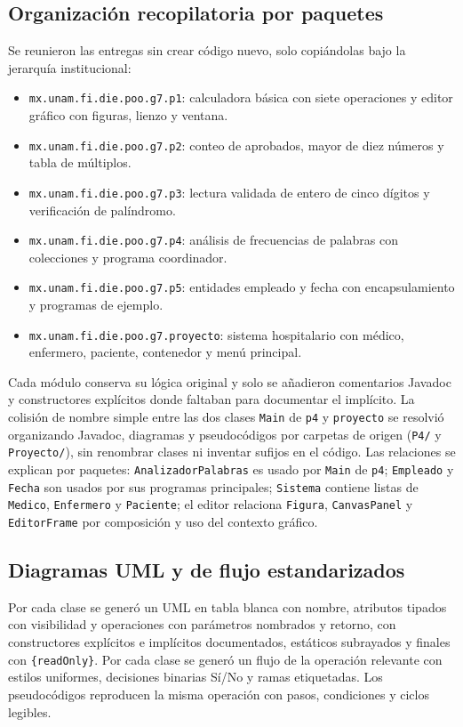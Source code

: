 \documentclass[letterpaper,12pt,oneside]{article}
\numberwithin{figure}{section}
\begin{document}
\subsection{Organizaci\'on recopilatoria por paquetes}
Se reunieron las entregas sin crear c\'odigo nuevo, solo copi\'andolas bajo la jerarqu\'ia institucional:
\begin{itemize}
    \item \texttt{mx.unam.fi.die.poo.g7.p1}: calculadora b\'asica con siete operaciones y editor gr\'afico con figuras, lienzo y ventana.
    \item \texttt{mx.unam.fi.die.poo.g7.p2}: conteo de aprobados, mayor de diez n\'umeros y tabla de m\'ultiplos.
    \item \texttt{mx.unam.fi.die.poo.g7.p3}: lectura validada de entero de cinco d\'igitos y verificaci\'on de pal\'indromo.
    \item \texttt{mx.unam.fi.die.poo.g7.p4}: an\'alisis de frecuencias de palabras con colecciones y programa coordinador.
    \item \texttt{mx.unam.fi.die.poo.g7.p5}: entidades empleado y fecha con encapsulamiento y programas de ejemplo.
    \item \texttt{mx.unam.fi.die.poo.g7.proyecto}: sistema hospitalario con m\'edico, enfermero, paciente, contenedor y men\'u principal.
\end{itemize}
Cada m\'odulo conserva su l\'ogica original y solo se a\~nadieron comentarios Javadoc y constructores expl\'icitos donde faltaban para documentar el impl\'icito. La colisi\'on de nombre simple entre las dos clases \texttt{Main} de \texttt{p4} y \texttt{proyecto} se resolvi\'o organizando Javadoc, diagramas y pseudoc\'odigos por carpetas de origen (\texttt{P4/} y \texttt{Proyecto/}), sin renombrar clases ni inventar sufijos en el c\'odigo. Las relaciones se explican por paquetes: \texttt{AnalizadorPalabras} es usado por \texttt{Main} de \texttt{p4}; \texttt{Empleado} y \texttt{Fecha} son usados por sus programas principales; \texttt{Sistema} contiene listas de \texttt{Medico}, \texttt{Enfermero} y \texttt{Paciente}; el editor relaciona \texttt{Figura}, \texttt{CanvasPanel} y \texttt{EditorFrame} por composici\'on y uso del contexto gr\'afico.

\subsection{Diagramas UML y de flujo estandarizados}
Por cada clase se gener\'o un UML en tabla blanca con nombre, atributos tipados con visibilidad y operaciones con par\'ametros nombrados y retorno, con constructores expl\'icitos e impl\'icitos documentados, est\'aticos subrayados y finales con \texttt{\{readOnly\}}. Por cada clase se gener\'o un flujo de la operaci\'on relevante con estilos uniformes, decisiones binarias S\'i/No y ramas etiquetadas. Los pseudoc\'odigos reproducen la misma operaci\'on con pasos, condiciones y ciclos legibles.
\end{document}
